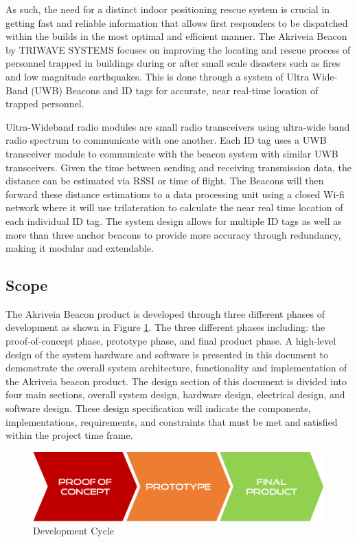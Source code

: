 \medskip
As such, the need for a distinct indoor positioning rescue system is crucial in getting fast and reliable information that allows first responders to be dispatched within the builds in the most optimal and efficient manner. The Akriveia Beacon by TRIWAVE SYSTEMS focuses on improving the locating and rescue process of personnel trapped in buildings during or after small scale disasters such as fires and low magnitude earthquakes. This is done through a system of Ultra Wide-Band (\Gls{UWB}) Beacons and \Gls{ID} tags for accurate, near real-time location of trapped personnel.

\medskip
Ultra-Wideband radio modules are small radio transceivers using ultra-wide band radio spectrum to communicate with one another. Each ID tag uses a UWB transceiver module to communicate with the beacon system with similar UWB transceivers. Given the time between sending and receiving transmission data, the distance can be estimated via \Gls{RSSI} or time of flight. The Beacons will then forward these distance estimations to a data processing unit using a closed Wi-fi network where it will use trilateration to calculate the near real time location of each individual ID tag. The system design allows for multiple ID tags as well as more than three anchor beacons to provide more accuracy through redundancy, making it modular and extendable.

\break
\subsection{Scope}

\medskip
The Akriveia Beacon product is developed through three different phases of development as shown in Figure \ref{dev}. The three different phases including: the proof-of-concept phase, prototype phase, and final product phase. A high-level design of the system hardware and software is presented in this document to demonstrate the overall system architecture, functionality and implementation of the Akriveia beacon product. The design section of this document is divided into four main sections, overall system design, hardware design, electrical design, and software design. These design specification will indicate the components, implementations, requirements, and constraints that must be met and satisfied within the project time frame. 

\medskip
\begin{figure}[H]
\centering
    \includegraphics[scale=0.4]{./images/dev-path.png}
    \caption{Development Cycle}
    \label{dev}
\end{figure}



